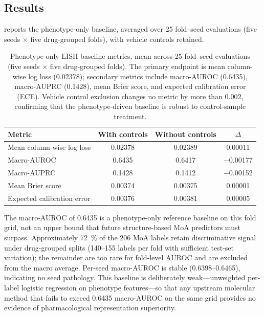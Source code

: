 \documentclass[11pt,a4paper]{article}
\begin{document}
\subsection{Results}
\label{sec:lish_si_results}

 reports the phenotype-only baseline, averaged over \num{25} fold--seed evaluations (five seeds $\times$ five drug-grouped folds), with vehicle controls retained.

\begin{table}[h]
\centering
\caption{Phenotype-only LISH baseline metrics, mean across \num{25} fold--seed evaluations (five seeds $\times$ five drug-grouped folds). The primary endpoint is mean column-wise log loss (\num{0.02378}); secondary metrics include macro-AUROC (\num{0.6435}), macro-AUPRC (\num{0.1428}), mean Brier score, and expected calibration error (ECE). Vehicle control exclusion changes no metric by more than \num{0.002}, confirming that the phenotype-driven baseline is robust to control-sample treatment.}
\label{tab:lish_metrics}
\begin{tabular}{lccc}
\toprule
Metric & With controls & Without controls & $\Delta$ \\
\midrule
Mean column-wise log loss & \num{0.02378} & \num{0.02389} & \num{+0.00011} \\
Macro-AUROC & \num{0.6435} & \num{0.6417} & \num{-0.00177} \\
Macro-AUPRC & \num{0.1428} & \num{0.1412} & \num{-0.00152} \\
Mean Brier score & \num{0.00374} & \num{0.00375} & \num{+0.00001} \\
Expected calibration error & \num{0.00376} & \num{0.00381} & \num{+0.00005} \\
\bottomrule
\end{tabular}
\end{table}

The macro-AUROC of \num{0.6435} is a phenotype-only reference baseline on this fold grid, not an upper bound that future structure-based MoA predictors must surpass. Approximately \qty{72}{\percent} of the \num{206} MoA labels retain discriminative signal under drug-grouped splits (\numrange{140}{155} labels per fold with sufficient test-set variation); the remainder are too rare for fold-level AUROC and are excluded from the macro average. Per-seed macro-AUROC is stable (\numrange{0.6398}{0.6465}), indicating no seed pathology. This baseline is deliberately weak---unweighted per-label logistic regression on phenotype features---so that any upstream molecular method that fails to exceed \num{0.6435} macro-AUROC on the same grid provides no evidence of pharmacological representation superiority.
\end{document}
